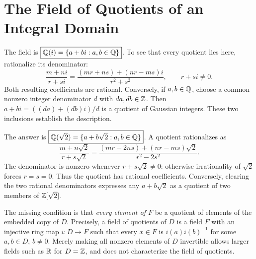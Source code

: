 \section{The Field of Quotients of an Integral Domain}

The field is $\boxed{\mathbb{Q}(i)=\{a+bi:a,b\in\mathbb{Q}\}}$. To see that every quotient lies here, rationalize its denominator:
\[\frac{m+ni}{r+si}=\frac{(mr+ns)+(nr-ms)i}{r^2+s^2},\qquad r+si\ne0.
\]
Both resulting coefficients are rational. Conversely, if $a,b\in\mathbb{Q}$, choose a common nonzero integer denominator $d$ with $da,db\in\mathbb{Z}$. Then $a+bi=((da)+(db)i)/d$ is a quotient of Gaussian integers. These two inclusions establish the description.

The answer is $\boxed{\mathbb{Q}(\sqrt2)=\{a+b\sqrt2:a,b\in\mathbb{Q}\}}$. A quotient rationalizes as
\[\frac{m+n\sqrt2}{r+s\sqrt2}=\frac{(mr-2ns)+(nr-ms)\sqrt2}{r^2-2s^2}.
\]
The denominator is nonzero whenever $r+s\sqrt2\ne0$: otherwise irrationality of $\sqrt2$ forces $r=s=0$. Thus the quotient has rational coefficients. Conversely, clearing the two rational denominators expresses any $a+b\sqrt2$ as a quotient of two members of $\mathbb{Z}[\sqrt2]$.

The missing condition is that \emph{every element of $F$} be a quotient of elements of the embedded copy of $D$. Precisely, a field of quotients of $D$ is a field $F$ with an injective ring map $i:D\to F$ such that every $x\in F$ is $i(a)i(b)^{-1}$ for some $a,b\in D$, $b\ne0$. Merely making all nonzero elements of $D$ invertible allows larger fields such as $\mathbb{R}$ for $D=\mathbb{Z}$, and does not characterize the field of quotients.

